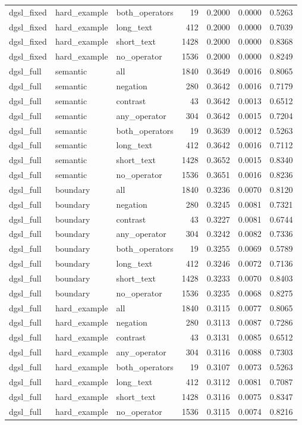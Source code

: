 \begin{tabular}{lllrrrr}
dgsl\_fixed & hard\_example & both\_operators & 19 & 0.2000 & 0.0000 & 0.5263 \\
dgsl\_fixed & hard\_example & long\_text & 412 & 0.2000 & 0.0000 & 0.7039 \\
dgsl\_fixed & hard\_example & short\_text & 1428 & 0.2000 & 0.0000 & 0.8368 \\
dgsl\_fixed & hard\_example & no\_operator & 1536 & 0.2000 & 0.0000 & 0.8249 \\
dgsl\_full & semantic & all & 1840 & 0.3649 & 0.0016 & 0.8065 \\
dgsl\_full & semantic & negation & 280 & 0.3642 & 0.0016 & 0.7179 \\
dgsl\_full & semantic & contrast & 43 & 0.3642 & 0.0013 & 0.6512 \\
dgsl\_full & semantic & any\_operator & 304 & 0.3642 & 0.0015 & 0.7204 \\
dgsl\_full & semantic & both\_operators & 19 & 0.3639 & 0.0012 & 0.5263 \\
dgsl\_full & semantic & long\_text & 412 & 0.3642 & 0.0016 & 0.7112 \\
dgsl\_full & semantic & short\_text & 1428 & 0.3652 & 0.0015 & 0.8340 \\
dgsl\_full & semantic & no\_operator & 1536 & 0.3651 & 0.0016 & 0.8236 \\
dgsl\_full & boundary & all & 1840 & 0.3236 & 0.0070 & 0.8120 \\
dgsl\_full & boundary & negation & 280 & 0.3245 & 0.0081 & 0.7321 \\
dgsl\_full & boundary & contrast & 43 & 0.3227 & 0.0081 & 0.6744 \\
dgsl\_full & boundary & any\_operator & 304 & 0.3242 & 0.0082 & 0.7336 \\
dgsl\_full & boundary & both\_operators & 19 & 0.3255 & 0.0069 & 0.5789 \\
dgsl\_full & boundary & long\_text & 412 & 0.3246 & 0.0072 & 0.7136 \\
dgsl\_full & boundary & short\_text & 1428 & 0.3233 & 0.0070 & 0.8403 \\
dgsl\_full & boundary & no\_operator & 1536 & 0.3235 & 0.0068 & 0.8275 \\
dgsl\_full & hard\_example & all & 1840 & 0.3115 & 0.0077 & 0.8065 \\
dgsl\_full & hard\_example & negation & 280 & 0.3113 & 0.0087 & 0.7286 \\
dgsl\_full & hard\_example & contrast & 43 & 0.3131 & 0.0085 & 0.6512 \\
dgsl\_full & hard\_example & any\_operator & 304 & 0.3116 & 0.0088 & 0.7303 \\
dgsl\_full & hard\_example & both\_operators & 19 & 0.3107 & 0.0073 & 0.5263 \\
dgsl\_full & hard\_example & long\_text & 412 & 0.3112 & 0.0081 & 0.7087 \\
dgsl\_full & hard\_example & short\_text & 1428 & 0.3116 & 0.0075 & 0.8347 \\
dgsl\_full & hard\_example & no\_operator & 1536 & 0.3115 & 0.0074 & 0.8216 \\
\bottomrule
\end{tabular}
